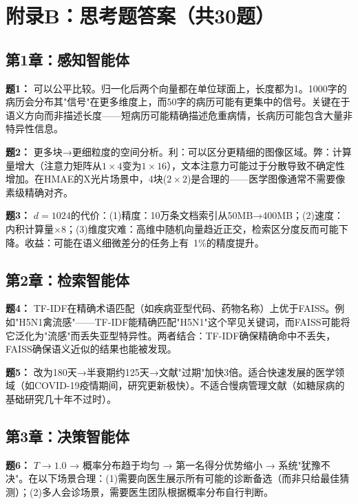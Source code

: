 \documentclass[11pt,a4paper]{ctexart}
\begin{document}
\newpage

\section*{附录B：思考题答案（共30题）}

\subsection*{第1章：感知智能体}

\textbf{题1：} 可以公平比较。归一化后两个向量都在单位球面上，长度都为1。1000字的病历会分布其"信号"在更多维度上，而50字的病历可能有更集中的信号。关键在于语义方向而非描述长度——短病历可能精确描述危重病情，长病历可能包含大量非特异性信息。

\textbf{题2：} 更多块→更细粒度的空间分析。利：可以区分更精细的图像区域。弊：计算量增大（注意力矩阵从$1 \times 4$变为$1 \times 16$），文本注意力可能过于分散导致不确定性增加。在HMAE的X光片场景中，4块($2 \times 2$)是合理的——医学图像通常不需要像素级精确对齐。

\textbf{题3：} $d=1024$的代价：(1)精度：10万条文档索引从50MB→400MB；(2)速度：内积计算量$\times 8$；(3)维度灾难：高维中随机向量趋近正交，检索区分度反而可能下降。收益：可能在语义细微差分的任务上有~1\%的精度提升。

\subsection*{第2章：检索智能体}

\textbf{题4：} TF-IDF在精确术语匹配（如疾病亚型代码、药物名称）上优于FAISS。例如"H5N1禽流感"——TF-IDF能精确匹配"H5N1"这个罕见关键词，而FAISS可能将它泛化为"流感"而丢失亚型特异性。两者结合：TF-IDF确保精确命中不丢失，FAISS确保语义近似的结果也能被发现。

\textbf{题5：} 改为180天→半衰期约125天→文献"过期"加快3倍。适合快速发展的医学领域（如COVID-19疫情期间，研究更新极快）。不适合慢病管理文献（如糖尿病的基础研究几十年不过时）。

\subsection*{第3章：决策智能体}

\textbf{题6：} $T \to 1.0$ → 概率分布趋于均匀 → 第一名得分优势缩小 → 系统"犹豫不决"。在以下场景合理：(1)需要向医生展示所有可能的诊断备选（而非只给最佳猜测）；(2)多人会诊场景，需要医生团队根据概率分布自行判断。
\end{document}
